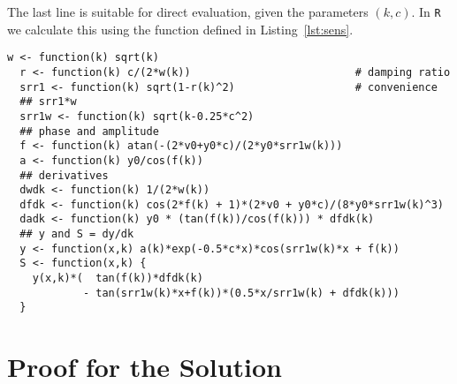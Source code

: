 \documentclass[utf8,english,DIV=12]{scrartcl}
\begin{document}
The last line is suitable for direct evaluation, given the parameters $(k,c)$. In \texttt{R} we calculate this using the function defined in Listing~\ref{lst:sens}.  
\begin{lstlisting}[caption={Calculation of the sensitivity in \texttt{R}. The variables have slightly different names: \texttt{srr1(k)} is $\Gamma_k$ and \texttt{srr1w(k)} is $\Gamma_k\omega_k$. The independent variable $t$ is \texttt{x} in the code.},label={lst:sens},float]
  w <- function(k) sqrt(k)
  r <- function(k) c/(2*w(k))                          # damping ratio
  srr1 <- function(k) sqrt(1-r(k)^2)                   # convenience
  ## srr1*w
  srr1w <- function(k) sqrt(k-0.25*c^2)
  ## phase and amplitude
  f <- function(k) atan(-(2*v0+y0*c)/(2*y0*srr1w(k))) 
  a <- function(k) y0/cos(f(k))
  ## derivatives
  dwdk <- function(k) 1/(2*w(k))
  dfdk <- function(k) cos(2*f(k) + 1)*(2*v0 + y0*c)/(8*y0*srr1w(k)^3)
  dadk <- function(k) y0 * (tan(f(k))/cos(f(k))) * dfdk(k)
  ## y and S = dy/dk
  y <- function(x,k) a(k)*exp(-0.5*c*x)*cos(srr1w(k)*x + f(k))
  S <- function(x,k) {
    y(x,k)*(  tan(f(k))*dfdk(k)
            - tan(srr1w(k)*x+f(k))*(0.5*x/srr1w(k) + dfdk(k)))
  }
\end{lstlisting}


\section{Proof for the Solution}
\label{sec:proof}
\end{document}
